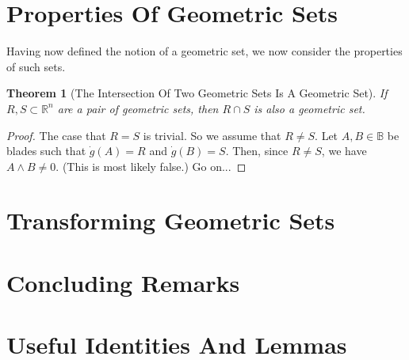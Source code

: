\documentclass{birkjour}
\newtheorem{thm}{Theorem}[section]
\theoremstyle{definition}
\theoremstyle{remark}
\numberwithin{equation}{section}
\newcommand{\R}{\mathbb{R}}
\newcommand{\B}{\mathbb{B}}
\newcommand{\gd}{\dot{g}}
\begin{document}
\section{Properties Of Geometric Sets}

Having now defined the notion of a geometric set, we now consider the properties of such sets.

\begin{thm}[The Intersection Of Two Geometric Sets Is A Geometric Set]
If $R,S\subset\R^n$ are a pair of geometric sets, then $R\cap S$ is also a geometric set.
\end{thm}
\begin{proof}
The case that $R=S$ is trivial.  So we assume that $R\neq S$.
Let $A,B\in\B$ be blades such that $\gd(A)=R$ and $\gd(B)=S$.
Then, since $R\neq S$, we have $A\wedge B\neq 0$.  (This is most likely false.)
Go on...
\end{proof}





\section{Transforming Geometric Sets}


\section{Concluding Remarks}


\section{Useful Identities And Lemmas}\label{sec_useful_identities}
\end{document}
